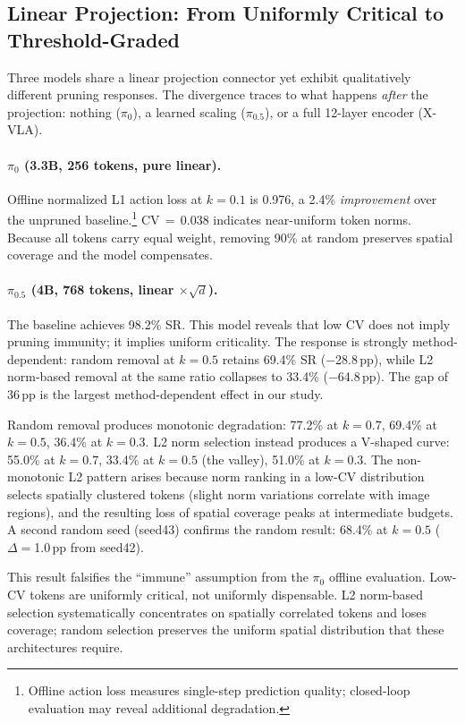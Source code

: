 \subsection{Linear Projection: From Uniformly Critical to Threshold-Graded}
\label{sec:linear_results}

Three models share a linear projection connector yet exhibit qualitatively different pruning responses. The divergence traces to what happens \emph{after} the projection: nothing ($\pi_0$), a learned scaling ($\pi_0.5$), or a full 12-layer encoder (X-VLA).

\paragraph{$\pi_0$ (3.3B, 256 tokens, pure linear).} Offline normalized L1 action loss at $k{=}0.1$ is 0.976, a 2.4\% \emph{improvement} over the unpruned baseline.\footnote{Offline action loss measures single-step prediction quality; closed-loop evaluation may reveal additional degradation.} CV$\,{=}\,$0.038 indicates near-uniform token norms. Because all tokens carry equal weight, removing 90\% at random preserves spatial coverage and the model compensates.

\paragraph{$\pi_0.5$ (4B, 768 tokens, linear $\times\!\sqrt{d}$).} The baseline achieves 98.2\% SR. This model reveals that low CV does not imply pruning immunity; it implies uniform criticality. The response is strongly method-dependent: random removal at $k{=}0.5$ retains 69.4\% SR ($-$28.8\,pp), while L2 norm-based removal at the same ratio collapses to 33.4\% ($-$64.8\,pp). The gap of 36\,pp is the largest method-dependent effect in our study.

Random removal produces monotonic degradation: 77.2\% at $k{=}0.7$, 69.4\% at $k{=}0.5$, 36.4\% at $k{=}0.3$. L2 norm selection instead produces a V-shaped curve: 55.0\% at $k{=}0.7$, 33.4\% at $k{=}0.5$ (the valley), 51.0\% at $k{=}0.3$. The non-monotonic L2 pattern arises because norm ranking in a low-CV distribution selects spatially clustered tokens (slight norm variations correlate with image regions), and the resulting loss of spatial coverage peaks at intermediate budgets. A second random seed (seed43) confirms the random result: 68.4\% at $k{=}0.5$ ($\Delta{=}$1.0\,pp from seed42).

This result falsifies the ``immune'' assumption from the $\pi_0$ offline evaluation. Low-CV tokens are uniformly critical, not uniformly dispensable. L2 norm-based selection systematically concentrates on spatially correlated tokens and loses coverage; random selection preserves the uniform spatial distribution that these architectures require.

